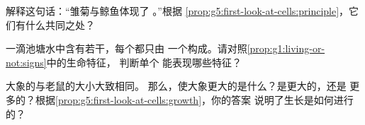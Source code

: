 \begin{exercise}[$\star\star$]\label{exo:g5:first-look-at-cells:9}
解释这句话：“雏菊与鲸鱼体现了
。”根据
\cref{prop:g5:first-look-at-cells:principle}，它们有什么共同之处？
\end{exercise}

\begin{exercise}[$\star\star$]\label{exo:g5:first-look-at-cells:10}
一滴池塘水中含有若干，每个都只由
一个构成。请对照\cref{prop:g1:living-or-not:signs}中的生命特征，
判断单个
能表现哪些特征？
\end{exercise}

\begin{exercise}[$\star\star\star$]\label{exo:g5:first-look-at-cells:11}
大象的与老鼠的大小大致相同。
那么，使大象更大的是什么？是更大的，还是
更多的？根据\cref{prop:g5:first-look-at-cells:growth}，你的答案
说明了生长是如何进行的？
\end{exercise}
